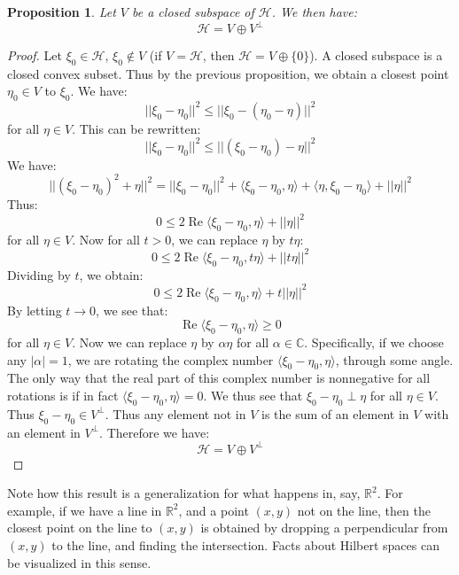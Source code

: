 \documentclass[a4paper,12pt]{report}
\newcommand{\ms}[1]{\mathscr{#1}}
\newcommand{\real} { \operatorname{Re} }
\newcommand{\imag} { \operatorname{Im} }
\newtheorem{prop}[theorem]{Proposition}
\begin{document}
	\begin{prop}
	Let $V$ be a closed subspace of $\ms{H}$. We then have:
	\[ \ms{H} = V \oplus V^\perp \]
	\end{prop}
	\begin{proof}
	Let $\xi_0 \in \ms{H}$, $\xi_0 \notin V$ (if $V = \ms{H}$, then $\ms{H} = V \oplus \{0\}$). A closed subspace is a closed convex subset. Thus by the previous proposition, we obtain a closest point $\eta_0 \in V$ to $\xi_0$. We have:
	\[ ||\xi_0 - \eta_0||^2 \leq ||\xi_0 - (\eta_0 - \eta)||^2 \]
	for all $\eta \in V$. This can be rewritten:
	\[ ||\xi_0 - \eta_0||^2 \leq ||(\xi_0 - \eta_0) - \eta||^2 \]
	We have:
	\[
	||(\xi_0 - \eta_0)^2 + \eta||^2 = ||\xi_0 - \eta_0||^2 + \langle \xi_0 - \eta_0, \eta \rangle + \langle \eta, \xi_0 - \eta_0 \rangle + ||\eta||^2 \]
	Thus:
	\[ 0 \leq 2 \real \langle \xi_0 - \eta_0, \eta \rangle + ||\eta||^2 \]
	for all $\eta \in V$. Now for all $t > 0$, we can replace $\eta$ by $t\eta$:
	\[ 0 \leq 2 \real \langle \xi_0 - \eta_0, t\eta \rangle + ||t\eta||^2 \]
	Dividing by $t$, we obtain:
	\[ 0 \leq 2 \real \langle \xi_0 - \eta_0, \eta \rangle + t||\eta||^2 \]
	By letting $t \rightarrow 0$, we see that:
	\[ \real \langle \xi_0 - \eta_0, \eta \rangle \geq 0 \]
	for all $\eta \in V$. Now we can replace $\eta$ by $\alpha \eta$ for all $\alpha \in \mathbb{C}$. Specifically, if we choose any $|\alpha| = 1$, we are rotating the complex number $\langle \xi_0 - \eta_0, \eta \rangle$, through some angle. The only way that the real part of this complex number is nonnegative for all rotations is if in fact $\langle \xi_0 - \eta_0, \eta \rangle = 0$. We thus see that $\xi_0 - \eta_0 \perp \eta$ for all $\eta \in V$. Thus $\xi_0 - \eta_0 \in V^\perp$. Thus any element not in $V$ is the sum of an element in $V$ with an element in $V^\perp$. Therefore we have:
	\[ \ms{H} = V \oplus V^\perp \]
	\end{proof}
	
	\noindent Note how this result is a generalization for what happens in, say, $\mathbb{R}^2$. For example, if we have a line in $\mathbb{R}^2$, and a point $(x, y)$ not on the line, then the closest point on the line to $(x, y)$ is obtained by dropping a perpendicular from $(x, y)$ to the line, and finding the intersection. Facts about Hilbert spaces can be visualized in this sense.
	
\end{document}
